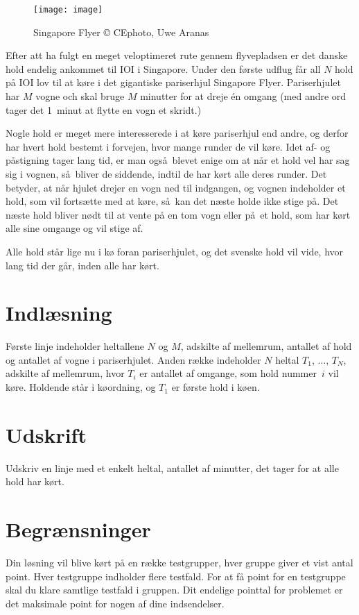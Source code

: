 \begin{wrapfigure}{r}{0.3\textwidth}
	\texttt{[image: image]}
	\caption{\centering Singapore Flyer \newline © CEphoto, Uwe Aranas}
\end{wrapfigure}

Efter att ha fulgt en meget veloptimeret rute gennem flyvepladsen er det danske hold endelig ankommet til IOI i Singapore.
Under den første udflug får all $N$ hold på IOI lov til at køre i det gigantiske pariserhjul Singapore Flyer.
Pariserhjulet har $M$ vogne och skal bruge $M$ minutter for at dreje én omgang (med andre ord tager det 1~minut at flytte en vogn et skridt.)

Nogle hold er meget mere interesserede i at køre pariserhjul end andre, og derfor har hvert hold bestemt i forvejen, hvor mange runder de vil køre.
Idet af- og påstigning tager lang tid, er man også blevet enige om at når et hold vel har sag sig i vognen, så bliver de siddende, indtil de har kørt alle deres runder.
Det betyder, at når hjulet drejer en vogn ned til indgangen, og vognen indeholder et hold, som vil fortsætte med at køre, så kan det næste holde ikke stige på.
Det næste hold bliver nødt til at vente på en tom vogn eller på et hold, som har kørt alle sine omgange og vil stige af.


Alle hold står lige nu i kø foran pariserhjulet, og det svenske hold vil vide, hvor lang tid der går, inden alle har kørt.

\section*{Indlæsning}
Første linje indeholder heltallene $N$ og $M$, adskilte af mellemrum, antallet af hold og antallet af vogne i pariserhjulet.
Anden række indeholder $N$ heltal $T_1$, $\ldots$, $T_N$, adskilte af mellemrum, hvor $T_i$ er antallet af omgange, som hold  nummer~$i$ vil køre.
Holdende står i køordning, og $T_1$ er første hold i køen.

\section*{Udskrift}
Udskriv en linje med et enkelt heltal, antallet af minutter, det tager for at alle hold har kørt.

\section*{Begrænsninger}
Din løsning vil blive kørt på en række testgrupper, hver gruppe giver et vist antal point.
Hver testgruppe indholder flere testfald.
For at få point for en testgruppe skal du klare samtlige testfald i gruppen.
Dit endelige pointtal for problemet er det maksimale point for nogen af dine indsendelser.

